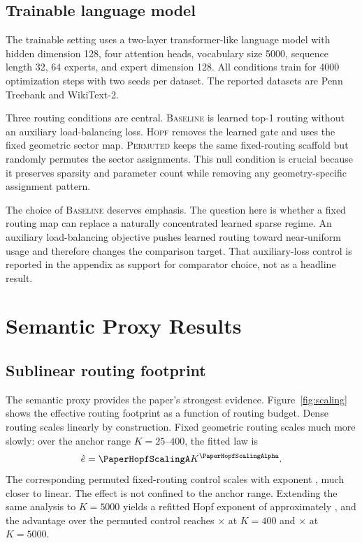 \documentclass[11pt,letterpaper]{article}
\begin{document}
\subsection{Trainable language model}
The trainable setting uses a two-layer transformer-like language model with hidden dimension 128, four attention heads, vocabulary size 5000, sequence length 32, 64 experts, and expert dimension 128. All conditions train for 4000 optimization steps with two seeds per dataset. The reported datasets are Penn Treebank and WikiText-2.

Three routing conditions are central. \textsc{Baseline} is learned top-1 routing without an auxiliary load-balancing loss. \textsc{Hopf} removes the learned gate and uses the fixed geometric sector map. \textsc{Permuted} keeps the same fixed-routing scaffold but randomly permutes the sector assignments. This null condition is crucial because it preserves sparsity and parameter count while removing any geometry-specific assignment pattern.

The choice of \textsc{Baseline} deserves emphasis. The question here is whether a fixed routing map can replace a naturally concentrated learned sparse regime. An auxiliary load-balancing objective pushes learned routing toward near-uniform usage and therefore changes the comparison target. That auxiliary-loss control is reported in the appendix as support for comparator choice, not as a headline result.

\section{Semantic Proxy Results}
\subsection{Sublinear routing footprint}
The semantic proxy provides the paper's strongest evidence. Figure~\ref{fig:scaling} shows the effective routing footprint as a function of routing budget. Dense routing scales linearly by construction. Fixed geometric routing scales much more slowly: over the anchor range $K=25$--$400$, the fitted law is
\begin{equation}
\hat e = \PaperHopfScalingA K^{\PaperHopfScalingAlpha}.
\end{equation}
The corresponding permuted fixed-routing control scales with exponent \PaperPermScalingAlpha, much closer to linear. The effect is not confined to the anchor range. Extending the same analysis to $K=5000$ yields a refitted Hopf exponent of approximately \PaperHopfLargeKAlpha, and the advantage over the permuted control reaches \PaperRatioAtFourHundred$\times$ at $K=400$ and \PaperRatioAtFiveThousand$\times$ at $K=5000$.
\end{document}
